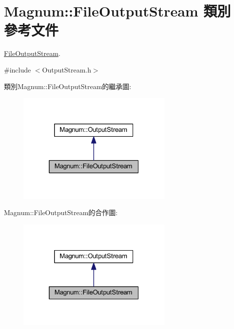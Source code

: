\hypertarget{class_magnum_1_1_file_output_stream}{}\section{Magnum\+:\+:File\+Output\+Stream 類別 參考文件}
\label{class_magnum_1_1_file_output_stream}


\hyperlink{class_magnum_1_1_file_output_stream}{File\+Output\+Stream}.  




{\ttfamily \#include $<$Output\+Stream.\+h$>$}



類別\+Magnum\+:\+:File\+Output\+Stream的繼承圖\+:\nopagebreak
\begin{figure}[H]
\begin{center}
\leavevmode
\includegraphics[width=217pt]{class_magnum_1_1_file_output_stream__inherit__graph}
\end{center}
\end{figure}


Magnum\+:\+:File\+Output\+Stream的合作圖\+:\nopagebreak
\begin{figure}[H]
\begin{center}
\leavevmode
\includegraphics[width=217pt]{class_magnum_1_1_file_output_stream__coll__graph}
\end{center}
\end{figure}

